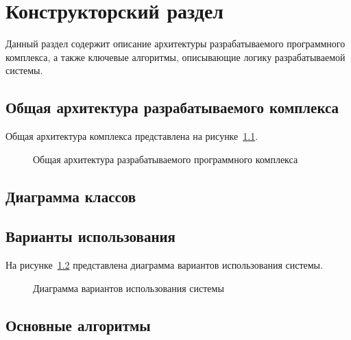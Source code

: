 \chapter{Конструкторский раздел}
Данный раздел содержит описание архитектуры разрабатываемого программного комплекса, а также ключевые алгоритмы, описывающие логику разрабатываемой системы.

\section{Общая архитектура разрабатываемого комплекса}
\label{sec:main_arch}

Общая архитектура комплекса представлена на рисунке~\ref{fig:main_arch}.

\begin{figure}
    \caption{Общая архитектура разрабатываемого программного комплекса}
    \label{fig:main_arch}
\end{figure}

\section{Диаграмма классов}

\section{Варианты использования}

На рисунке~\ref{fig:use_cases} представлена диаграмма вариантов использования системы.

\begin{figure}[htp!]
    \caption{Диаграмма вариантов использования системы}
    \label{fig:use_cases}
\end{figure}

\section{Основные алгоритмы}

